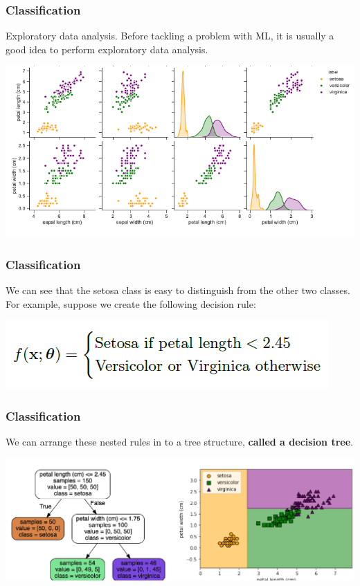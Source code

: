 \documentclass[spanish]{beamer}
\begin{document}
\begin{frame}
\frametitle{Classification}  
Exploratory data analysis. Before tackling a problem with ML, it is usually a good idea to perform exploratory data analysis.

\begin{center}
\includegraphics[width=\textwidth]{im5}
\end{center}

\end{frame}
\begin{frame}
\frametitle{Classification}  
We can see that the setosa class is easy to distinguish from the other two classes. For
example, suppose we create the following decision rule:

\begin{center}
\includegraphics[width=\textwidth]{im6}
\end{center}
\end{frame}
\begin{frame}
\frametitle{Classification}  
We can arrange these nested rules in to a tree structure, \textbf{called a decision tree}.
\begin{center}
\includegraphics[width=\textwidth]{im7}
\end{center}
\end{frame}
\end{document}
